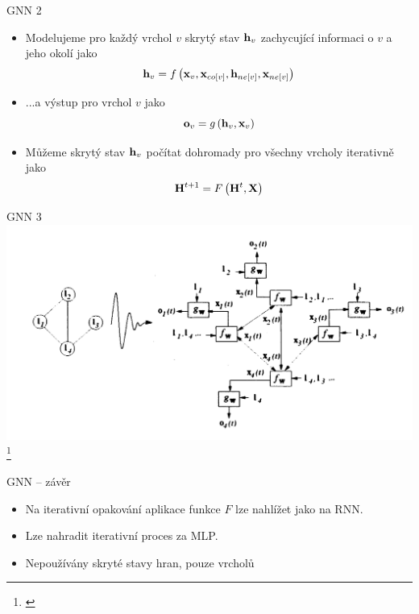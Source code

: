 \documentclass[10pt]{beamer}
\newcommand{\mathvec}{\ensuremath{\mathbf}}
\newcommand{\mathmat}{\ensuremath{\mathbf}}
\begin{document}
\begin{frame}{GNN 2}
	\begin{itemize}
		\item<1-> Modelujeme pro každý vrchol \( v \) skrytý stav \( \mathvec{h}_v \) zachycující informaci o \( v \) a jeho okolí jako 
			\[ \mathvec{h}_v = f \left( \mathvec{x}_v, \mathvec{x}_{co \left[ v \right]}, \mathvec{h}_{ne \left[ v \right]}, \mathvec{x}_{ne \left[ v \right]} \right) \]
		\item<2-> ...a výstup pro vrchol \( v \) jako
			\[ \mathvec{o}_v = g \left( \mathvec{h}_v, \mathvec{x}_v \right) \]
		\item<3-> Můžeme skrytý stav \( \mathvec{h}_v \) počítat dohromady pro všechny vrcholy iterativně jako
			\[ \mathmat{H}^{t + 1} = F \left( \mathmat{H}^t, \mathmat{X} \right) \]
	\end{itemize}
\end{frame}

\begin{frame}{GNN 3}
	\centering
	\includegraphics[width=0.9\pagewidth]{images/GNN.png}\footnote{\cite{gori_new_2005}}
\end{frame}

\begin{frame}{GNN -- závěr}
	\begin{itemize}
		\item Na iterativní opakování aplikace funkce \( F \) lze nahlížet jako na RNN.
		\item Lze nahradit iterativní proces za MLP.
		\item Nepoužívány skryté stavy hran, pouze vrcholů
	\end{itemize}
\end{frame}
\end{document}
